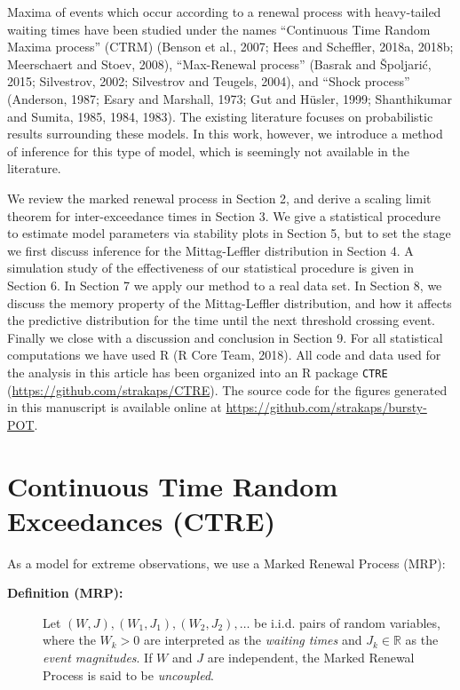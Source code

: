 \documentclass[]{elsarticle} %
\begin{document}
Maxima of events which occur according to a renewal process with
heavy-tailed waiting times have been studied under the names
``Continuous Time Random Maxima process'' (CTRM) (Benson et al., 2007;
Hees and Scheffler, 2018a, 2018b; Meerschaert and Stoev, 2008),
``Max-Renewal process'' (Basrak and Špoljarić, 2015; Silvestrov, 2002;
Silvestrov and Teugels, 2004), and ``Shock process'' (Anderson, 1987;
Esary and Marshall, 1973; Gut and Hüsler, 1999; Shanthikumar and Sumita,
1985, 1984, 1983). The existing literature focuses on probabilistic
results surrounding these models. In this work, however, we introduce a
method of inference for this type of model, which is seemingly not
available in the literature.

We review the marked renewal process in Section 2, and derive a scaling
limit theorem for inter-exceedance times in Section 3. We give a
statistical procedure to estimate model parameters via stability plots
in Section 5, but to set the stage we first discuss inference for the
Mittag-Leffler distribution in Section 4. A simulation study of the
effectiveness of our statistical procedure is given in Section 6. In
Section 7 we apply our method to a real data set. In Section 8, we
discuss the memory property of the Mittag-Leffler distribution, and how
it affects the predictive distribution for the time until the next
threshold crossing event. Finally we close with a discussion and
conclusion in Section 9. For all statistical computations we have used R
(R Core Team, 2018). All code and data used for the analysis in this
article has been organized into an R package \texttt{CTRE}
(\url{https://github.com/strakaps/CTRE}). The source code for the
figures generated in this manuscript is available online at
\url{https://github.com/strakaps/bursty-POT}.

\hypertarget{continuous-time-random-exceedances-ctre}{%
\section{Continuous Time Random Exceedances
(CTRE)}\label{continuous-time-random-exceedances-ctre}}

As a model for extreme observations, we use a Marked Renewal Process
(MRP):

\begin{description}
\item[\textbf{Definition (MRP):}]
Let \((W,J), (W_1, J_1), (W_2, J_2), \ldots\) be i.i.d. pairs of random
variables, where the \(W_k > 0\) are interpreted as the \emph{waiting
times} and \(J_k \in \mathbb{R}\) as the \emph{event magnitudes}. If
\(W\) and \(J\) are independent, the Marked Renewal Process is said to
be \emph{uncoupled}.
\end{description}
\end{document}

